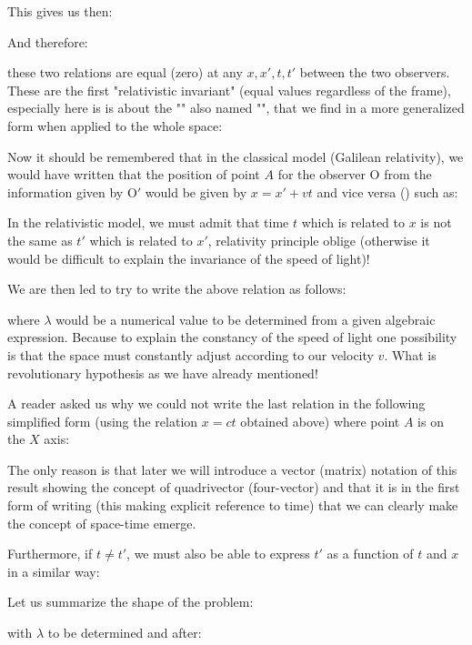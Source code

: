 		This gives us then:
		
		And therefore:
		
		these two relations are equal (zero) at any $x, x', t, t'$ between the two observers. These are the first "relativistic invariant" (equal values regardless of the frame), especially here is is about the "" also named "", that we find in a more generalized form when applied to the whole space:
		
		Now it should be remembered that in the classical model (Galilean relativity), we would have written that the position of point $A$ for the observer $\text{O}$ from the information given by $\text{O}'$ would be given by $x=x'+vt$ and vice versa () such as:
		
		In the relativistic model, we must admit that time $t$ which is related to $x$ is not the same as $t'$ which is related to $x'$, relativity principle oblige (otherwise it would be difficult to explain the invariance of the speed of light)!
		
		We are then led to try to write the above relation as follows:
		
		where $\lambda$ would be a numerical value to be determined from a given algebraic expression. Because to explain the constancy of the speed of light one possibility is that the space must constantly adjust according to our velocity $v$. What is revolutionary hypothesis as we have already mentioned!
	\begin{tcolorbox}[title=Remark,colframe=black,arc=10pt]
	A reader asked us why we could not write the last relation in the following simplified form (using the relation $x = ct$ obtained above) where point $A$ is on the $X$ axis:
	
	The only reason is that later we will introduce a vector (matrix) notation of this result showing the concept of quadrivector (four-vector) and that it is in the first form of writing (this making explicit reference to time) that we can clearly make the concept of space-time emerge.
	\end{tcolorbox}
	Furthermore, if $t\neq t'$, we must also be able to express $t'$ as a function of $t$ and $x$ in a similar way:
	
	Let us summarize the shape of the problem:
	
	with $\lambda$ to be determined and after:
	

